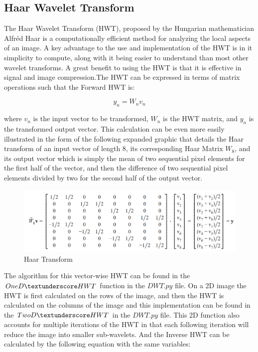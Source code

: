 \documentclass{article}
\begin{document}
\subsection{Haar Wavelet Transform}
The Haar Wavelet Transform (HWT), proposed by the Hungarian mathematician Alfr\'ed Haar is a computationally efficient method for analyzing the local aspects of an image. A key advantage to the use and implementation of the HWT is in it simplicity to compute, along with it being easier to understand than most other wavelet transforms. A great benefit to using the HWT is that it is effective in signal and image compression.The HWT can be expressed in terms of matrix operations such that the Forward HWT is:  

\begin{equation}\label{eqn:Forward_HWT}
y_{n} = W_{n}v_{n}
\end{equation}	 
 
 where $v_{n}$ is the input vector to be transformed, $W_{n}$ is the HWT matrix, and $y_{n}$ is the transformed output vector. This calculation can be even more easily illustrated in the form of the following expanded graphic that details the Haar transform of an input vector of length $8$, its corresponding Haar Matrix $W_{8}$, and its output vector which is simply the mean of two sequential pixel elements for the first half of the vector, and then the difference of two sequential pixel elements divided by two for the second half of the output vector. 
 
 \begin{figure}[h!]
 	\centering
	\includegraphics[width=\linewidth]{../../1_Resources/images/Haar_matrix_8.png}
	\caption{Haar Transform}
 	\label{fig:Haar_Forward}
 \end{figure}
 
 The algorithm for this vector-wise HWT can be found in the $OneD\textunderscore HWT$ function in the $DWT.py$ file. On a 2D image the HWT is first calculated on the rows of the image, and then the HWT is calculated on the columns of the image and this implementation can be found in the $TwoD\textunderscore HWT$ in the $DWT.py$ file. This 2D function also accounts for multiple iterations of the HWT in that each following iteration will reduce the image into smaller sub-wavelets.  
 And the Inverse HWT can be calculated by the following equation with the same variables:
 
\end{document}
